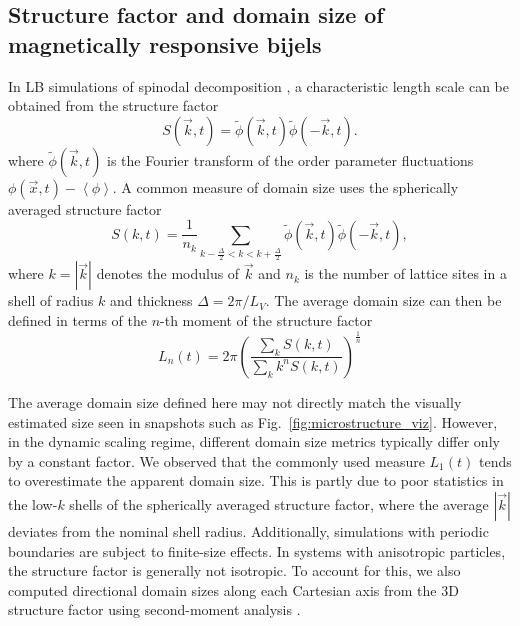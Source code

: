 \subsection{Structure factor and domain size of magnetically responsive bijels}
    
    In LB simulations of spinodal decomposition
    \cite{kendon_3d_1999,kendon_inertial_2001}, a characteristic length
    scale can be obtained from the structure factor
    \begin{equation}
    S(\vec{k},t) = \tilde{\phi}(\vec{k},t)\tilde{\phi}(-\vec{k},t) .
    \end{equation}
    where \(\tilde{\phi}(\vec{k},t)\) is the Fourier
    transform of the order parameter fluctuations
    \(\phi(\vec{x},t)-\left\langle\phi\right\rangle\). A common measure of
    domain size uses the spherically averaged structure factor
    \begin{equation}
    S(k,t) = \frac{1}{n_k} \sum_{k-\frac{\Delta}{2}<k<k+\frac{\Delta}{2}} \tilde{\phi}(\vec{k},t)\tilde{\phi}(-\vec{k},t) ,
    \end{equation}
    where \(k=|\vec{k}|\) denotes the modulus of \(\vec{k}\)
    and \(n_k\) is the number of lattice sites in a shell of radius \(k\)
    and thickness \(\Delta=2\pi/L_V\). The average domain size can then be
    defined in terms of the \(n\)-th moment of the structure factor
    \cite{laradji_molecular_1996}
    \begin{equation}
        L_n(t) = 2\pi \left( \frac{\sum_k S(k,t)}{\sum_k k^n S(k,t)} \right)^{\frac{1}{n}}
        \label{eq:spherically_averaged_structure_factor}
    \end{equation}
    
The average domain size defined here may not directly match the visually estimated size seen in snapshots such as Fig.~\ref{fig:microstructure_viz}. 
However, in the dynamic scaling regime, different domain size metrics typically differ only by a constant factor. We observed that the commonly used 
measure \(L_1(t)\) tends to overestimate the apparent domain size. This is partly due to poor statistics in the low-\(k\) shells of the spherically 
averaged structure factor, where the average \(|\vec{k}|\) deviates from the nominal shell radius. Additionally, simulations with periodic boundaries 
are subject to finite-size effects. In systems with anisotropic particles, the structure factor is generally not isotropic. To account for this, we 
also computed directional domain sizes along each Cartesian axis from the 3D structure factor using second-moment analysis \cite{jansen_bijels_2011, 
gunther_timescales_2014}.

